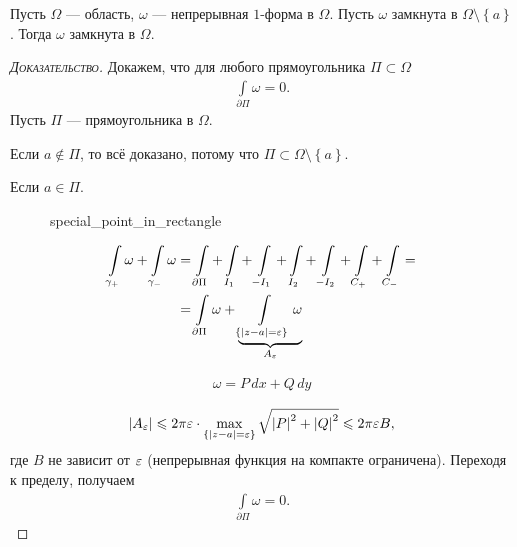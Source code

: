 \documentclass[../../main.tex]{subfiles}
\begin{document}
\begin{lm}
\label{lemma:ob_ustranenii_osobennosti}
 Пусть $\Omega$ --- область, $\omega$ --- непрерывная $1$-форма в $\Omega$. Пусть $\omega$ замкнута  в $\Omega \setminus \left\{ a \right\}$. Тогда $\omega$ замкнута в $\Omega$.
\end{lm}
\begin{proof}[\normalfont\textsc{Доказательство}]
 Докажем, что для любого прямоугольника $\Pi \subset \Omega$
 \begin{align*}
  \int\limits_{\partial\Pi} \omega = 0. 
 \end{align*} Пусть $\Pi$ --- прямоугольника в $\Omega$.

 Если $a \notin \Pi$, то всё доказано, потому что $\Pi \subset \Omega \setminus \left\{ a \right\}$.

 Если $a \in \Pi$.

\begin{figure}[ht]
    \centering
    \caption{special_point_in_rectangle}
    \label{fig:special_point_in_rectangle}
\end{figure}

\begin{align*}
 \int\limits_{\gamma_+}  \omega + \int\limits_{\gamma_-}  \omega &= \int\limits_{\partial\Pi} + \int\limits_{I_1}   + \int\limits_{-I_1}   + \int\limits_{I_2}  + \int\limits_{-I_2}   + \int\limits_{C_+}   + \int\limits_{C_-}   = \\
 &= \int\limits_{\partial\Pi} \omega + \underbrace{\int\limits_{\left\{ \left| z-a \right|=\varepsilon \right\}} \omega}_{A_{\varepsilon}} 
\end{align*} 

\begin{align*}
 \omega = P\,dx + Q\,dy
\end{align*} 

\begin{align*}
 \left| A_{\varepsilon} \right| \leqslant 2\pi\varepsilon \cdot \max_{\left\{ \left| z-a \right|=\varepsilon \right\}} \sqrt{\left| P \right|^{2} + \left| Q \right|^{2}} \leqslant 2\pi\varepsilon B,
\end{align*} где $B$ не зависит от $\varepsilon$ (непрерывная функция на компакте ограничена). Переходя к пределу, получаем 
\begin{align*}
 \int\limits_{\partial\Pi}   \omega = 0.
\end{align*} 
 
\end{proof}
\end{document}

